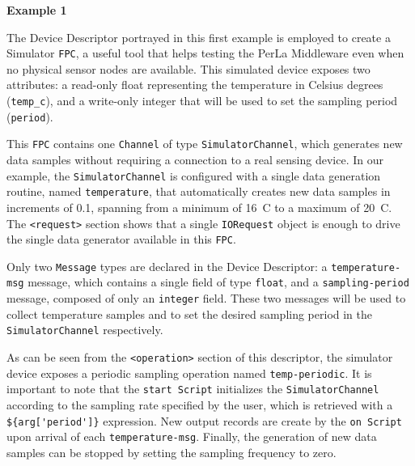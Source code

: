 \textbf{Example 1}

The Device Descriptor portrayed in this first example is employed to create a
Simulator \texttt{FPC}, a useful tool that helps testing the PerLa Middleware
even when no physical sensor nodes are available. This simulated device exposes
two attributes: a read-only float representing the temperature in Celsius
degrees (\texttt{temp\_c}), and a write-only integer that will be used to set
the sampling period (\texttt{period}).

This \texttt{FPC} contains one \texttt{Channel} of type
\texttt{SimulatorChannel}, which generates new data samples without requiring a
connection to a real sensing device. In our example, the
\texttt{SimulatorChannel} is configured with a single data generation routine,
named \texttt{temperature}, that automatically creates new data samples in
increments of 0.1\degree, spanning from a minimum of 16\degree~C to a maximum
of 20\degree~C. The \lstinline!<request>! section shows that a single
\texttt{IORequest} object is enough to drive the single data generator
available in this \texttt{FPC}.

Only two \texttt{Message} types are declared in the Device Descriptor: a
\texttt{temperature-msg} message, which contains a single field of type
\texttt{float}, and a \texttt{sampling-period} message, composed of only an
\texttt{integer} field. These two messages will be used to collect temperature
samples and to set the desired sampling period in the \texttt{SimulatorChannel}
respectively.

As can be seen from the \lstinline!<operation>! section of this descriptor, the
simulator device exposes a periodic sampling operation named
\texttt{temp-periodic}. It is important to note that the \texttt{start Script}
initializes the \texttt{SimulatorChannel} according to the sampling rate
specified by the user, which is retrieved with a \lstinline!${arg['period']}!
expression. New output records are create by the \texttt{on Script} upon
arrival of each \texttt{temperature-msg}. Finally, the generation of new data
samples can be stopped by setting the sampling frequency to zero.

